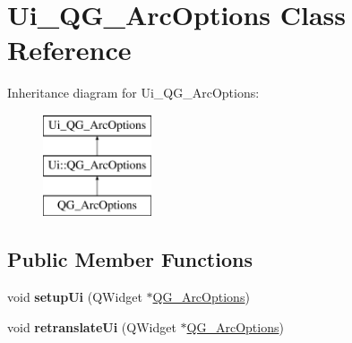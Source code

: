 \hypertarget{classUi__QG__ArcOptions}{\section{Ui\-\_\-\-Q\-G\-\_\-\-Arc\-Options Class Reference}
\label{classUi__QG__ArcOptions}
}
Inheritance diagram for Ui\-\_\-\-Q\-G\-\_\-\-Arc\-Options\-:\begin{figure}[H]
\begin{center}
\leavevmode
\includegraphics[height=3.000000cm]{classUi__QG__ArcOptions}
\end{center}
\end{figure}
\subsection*{Public Member Functions}
\begin{DoxyCompactItemize}
\item 
\hypertarget{classUi__QG__ArcOptions_ad9e6efbb8aa076a1055e568e6d832dd4}{void {\bfseries setup\-Ui} (Q\-Widget $\ast$\hyperlink{classQG__ArcOptions}{Q\-G\-\_\-\-Arc\-Options})}\label{classUi__QG__ArcOptions_ad9e6efbb8aa076a1055e568e6d832dd4}

\item 
\hypertarget{classUi__QG__ArcOptions_ade44cfc2bb3eb94304b4a21a7a6e158c}{void {\bfseries retranslate\-Ui} (Q\-Widget $\ast$\hyperlink{classQG__ArcOptions}{Q\-G\-\_\-\-Arc\-Options})}\label{classUi__QG__ArcOptions_ade44cfc2bb3eb94304b4a21a7a6e158c}

\end{DoxyCompactItemize}

